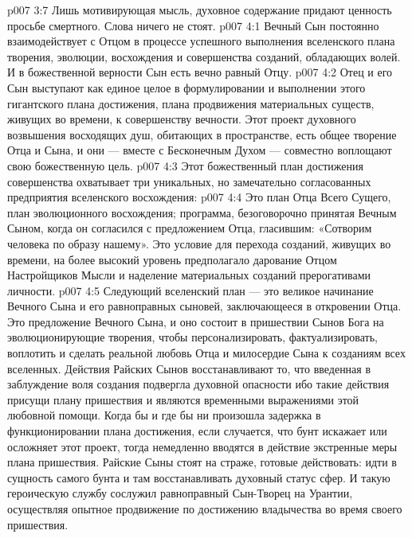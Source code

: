 \vs p007 3:7 Лишь мотивирующая мысль, духовное содержание придают ценность просьбе смертного. Слова ничего не стоят.
\vs p007 4:1 Вечный Сын постоянно взаимодействует с Отцом в процессе успешного выполнения  вселенского плана творения, эволюции, восхождения и совершенства созданий, обладающих волей. И в божественной верности Сын есть вечно равный Отцу.
\vs p007 4:2 Отец и его Сын выступают как единое целое в формулировании и выполнении этого гигантского плана достижения, плана продвижения материальных существ, живущих во времени, к совершенству вечности. Этот проект духовного возвышения восходящих душ, обитающих в пространстве, есть общее творение Отца и Сына, и они --- вместе с Бесконечным Духом --- совместно воплощают свою божественную цель.
\vs p007 4:3 \pc Этот божественный план достижения совершенства охватывает три уникальных, но замечательно согласованных предприятия вселенского восхождения:
\vs p007 4:4 \bibnobreakspace {} Это план Отца Всего Сущего, план эволюционного восхождения; программа, безоговорочно принятая Вечным Сыном, когда он согласился с предложением Отца, гласившим: «Сотворим человека по образу нашему». Это условие для перехода созданий, живущих во времени, на более высокий уровень предполагало дарование Отцом Настройщиков Мысли и наделение материальных созданий прерогативами личности.
\vs p007 4:5 \bibnobreakspace {} Следующий вселенский план --- это великое начинание Вечного Сына и его равноправных сыновей, заключающееся в откровении Отца. Это предложение Вечного Сына, и оно состоит в пришествии Сынов Бога на эволюционирующие творения, чтобы персонализировать, фактуализировать, воплотить и сделать реальной любовь Отца и милосердие Сына к созданиям всех вселенных. Действия Райских Сынов восстанавливают то, что введенная в заблуждение воля создания подвергла духовной опасности ибо такие действия присущи плану пришествия и являются временными выражениями этой любовной помощи. Когда бы и где бы ни произошла задержка в функционировании плана достижения, если случается, что бунт искажает или осложняет этот проект, тогда немедленно вводятся в действие экстренные меры плана пришествия. Райские Сыны стоят на страже, готовые действовать: идти в сущность самого бунта и там восстанавливать духовный статус сфер. И такую героическую службу сослужил равноправный Сын\hyp{}Творец на Урантии, осуществляя опытное продвижение по достижению владычества во время своего пришествия.
